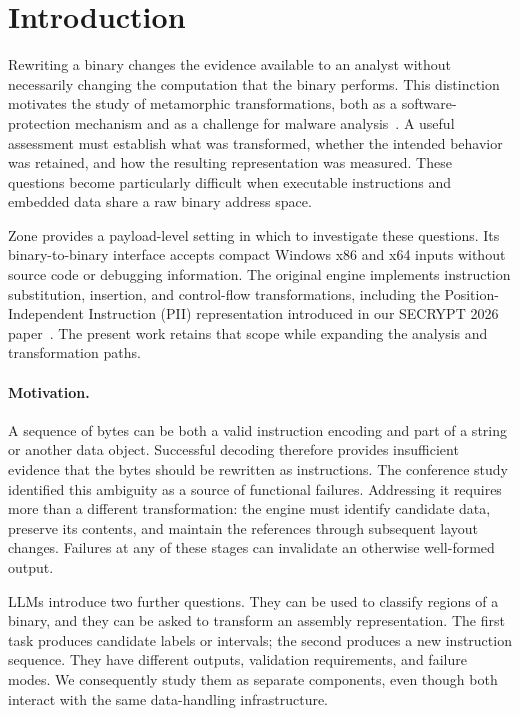 \section{Introduction}\label{sec:introduction}
Rewriting a binary changes the evidence available to an analyst without
necessarily changing the computation that the binary performs. This
distinction motivates the study of metamorphic transformations, both as
a software-protection mechanism and as a challenge for malware
analysis~\cite{PEsurveybible,metamorphic1,metamorphic2}. A useful assessment
must establish what was transformed, whether the intended behavior was
retained, and how the resulting representation was measured. These
questions become particularly difficult when executable instructions and
embedded data share a raw binary address space.

Zone provides a payload-level setting in which to investigate these
questions. Its binary-to-binary interface accepts compact Windows x86
and x64 inputs without source code or debugging information. The original
engine implements instruction substitution, insertion, and control-flow
transformations, including the Position-Independent Instruction (PII)
representation introduced in our SECRYPT 2026
paper~\cite{zone_secrypt_2026}. The present work retains that scope while
expanding the analysis and transformation paths.

\paragraph{Motivation.}
A sequence of bytes can be both a valid instruction encoding and part of
a string or another data object. Successful decoding therefore provides
insufficient evidence that the bytes should be rewritten as instructions.
The conference study identified this ambiguity as a source of functional
failures. Addressing it requires more than a different transformation:
the engine must identify candidate data, preserve its contents, and
maintain the references through subsequent layout changes. Failures at
any of these stages can invalidate an otherwise well-formed output.

LLMs introduce two further questions. They can be used to classify
regions of a binary, and they can be asked to transform an assembly
representation. The first task produces candidate labels or intervals;
the second produces a new instruction sequence. They have different
outputs, validation requirements, and failure modes. We consequently
study them as separate components, even though both interact with the
same data-handling infrastructure.

